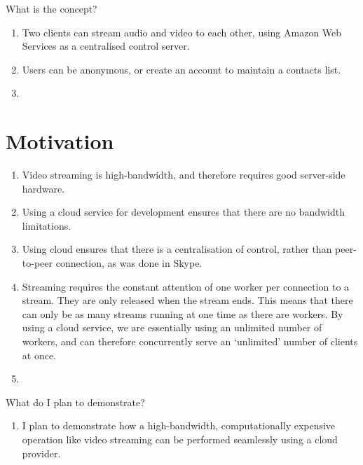 \documentclass[conference]{IEEEtran}
\begin{document}
What is the concept? 
\begin{enumerate} 
	\item Two clients can stream audio and video to each other, using Amazon Web Services as a centralised control server.
	\item Users can be anonymous, or create an account to maintain a contacts list. 
	\item \end{enumerate} 


\section{Motivation}

\begin{enumerate}
	\item Video streaming is high-bandwidth, and therefore requires good server-side hardware. 
	\item Using a cloud service for development ensures that there are no bandwidth limitations.
	\item Using cloud ensures that there is a centralisation of control, rather than peer-to-peer connection, as was done in Skype. 
	\item Streaming requires the constant attention of one worker per connection to a stream. They are only released when the stream ends. This means that there can only be as many streams running at one time as there are workers. By using a cloud service, we are essentially using an unlimited number of workers, and can therefore concurrently serve an `unlimited' number of clients at once. 
	\item
\end{enumerate}


What do I plan to demonstrate?
\begin{enumerate}
	\item I plan to demonstrate how a high-bandwidth, computationally expensive operation like video streaming can be performed seamlessly using a cloud provider. 
	
\end{enumerate} 
\end{document}
